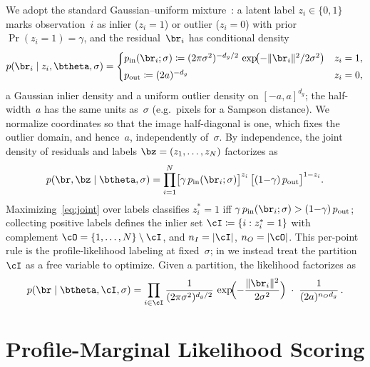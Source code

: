 \documentclass{article}
\newcommand{\pin}{p_{\mathrm{in}}}
\newcommand{\pout}{p_{\mathrm{out}}}
\newcommand{\gaussunif}{Gaussian--uniform\xspace}
\begin{document}
We adopt the standard \gaussunif
mixture~\cite{Torr2000,Shekhovtsov2025}: a latent label $z_i \in
	\{0,1\}$ marks observation~$i$ as inlier ($z_i{=}1$) or outlier
($z_i{=}0$) with prior $\Pr(z_i{=}1) = \gamma$, and the
residual~$\br_i$ has conditional density
\begin{equation}
	p(\br_i \mid z_i, \btheta, \sigma) = \begin{cases}
		\pin(\br_i;\sigma) \coloneqq (2\pi\sigma^2)^{-d_g/2}\,
		\exp\!\bigl({-}\|\br_i\|^2/2\sigma^2\bigr) & z_i = 1, \\[3pt]
		\pout \coloneqq (2a)^{-d_g}                & z_i = 0,
	\end{cases}
	\label{eq:component-densities}
\end{equation}
a Gaussian inlier density and a uniform outlier density on
$[-a,a]^{d_g}$; the half-width~$a$ has the same units as~$\sigma$
(e.g.\ pixels for a Sampson distance).  We normalize coordinates so
that the image half-diagonal is one, which fixes the outlier domain,
and hence~$a$, independently of~$\sigma$.  By independence, the joint
density of residuals and labels $\bz = (z_1,\ldots,z_N)$ factorizes as
\begin{equation}
	p(\br, \bz \mid \btheta, \sigma) = \prod_{i=1}^{N} \bigl[\gamma\,
		\pin(\br_i;\sigma)\bigr]^{z_i}\, \bigl[(1{-}\gamma)\,
		\pout\bigr]^{1-z_i}.
	\label{eq:joint}
\end{equation}
Maximizing~\eqref{eq:joint} over labels classifies $z_i^*=1$ iff
$\gamma\,\pin(\br_i;\sigma) > (1{-}\gamma)\,\pout$; collecting
positive labels defines the inlier set $\cI \coloneqq \{i : z_i^* =
	1\}$ with complement $\cO = \{1,\ldots,N\}\setminus\cI$, and $n_I =
	|\cI|$, $n_O = |\cO|$.  This per-point rule is the profile-likelihood
labeling at fixed~$\sigma$; in  we instead treat the
partition~$\cI$ as a free variable to optimize.  Given a partition,
the likelihood factorizes as
\begin{equation}
	p(\br \mid \btheta, \cI, \sigma) = \prod_{i \in \cI}
	\frac{1}{(2\pi\sigma^2)^{d_g/2}}\,
	\exp\!\Bigl({-}\frac{\|\br_i\|^2}{2\sigma^2}\Bigr) \;\cdot\;
	\frac{1}{(2a)^{n_O d_g}}\,.
	\label{eq:joint-partition}
\end{equation}

\section{Profile-Marginal Likelihood Scoring}
\label{sec:scoring}
\end{document}

